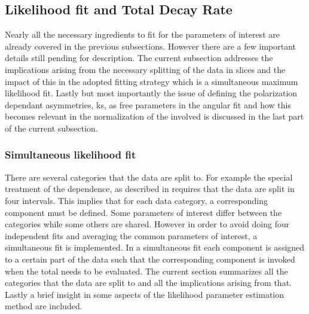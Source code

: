\subsection{Likelihood fit and Total Decay Rate}
\label{Total_Decay_Rate}

Nearly all the necessary ingredients to fit for the parameters of interest are already covered in the previous subsections.
However there are a few important details still pending for description. The current subsection addresses the
implications arising from the necessary splitting of the data in slices and the impact of this in the adopted
fitting strategy which is a simultaneous maximum likelihood fit. Lastly but most importantly the issue of defining
the polarization dependant \CP asymmetries, \Acp{k}, as free parameters in the angular fit and how this becomes
relevant in the normalization of the \pdfs involved is discussed in the last part of the current subsection.

\subsubsection{Simultaneous likelihood fit}
\label{Simutaneous_Likelihood_fit}
There are several categories that the data are split to.
For example the special treatment of the \mkpi dependence, as described in  requires that the data are
split in four \mkpi intervals. This implies that for each data category, a corresponding component \pdf must be defined.
Some parameters of interest differ between the categories while some others are shared.
However in order to avoid doing four independent fits and averaging the common parameters of interest,
a simultaneous fit is implemented. In a simultaneous fit each component \pdf is assigned to a certain part of the data
such that the corresponding component \pdf is invoked when the total \pdf needs to be evaluated. The current section summarizes
all the categories that the data are split to and all the implications arising from that. Lastly a brief insight in some aspects
of the likelihood parameter estimation method are included.

